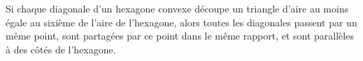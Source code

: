 Si chaque diagonale d'un hexagone convexe découpe un triangle d'aire au moins égale au sixième de l'aire de l'hexagone, alors toutes les diagonales passent par un même point, sont partagées par ce point dans le même rapport, et sont parallèles à des côtés de l'hexagone.
